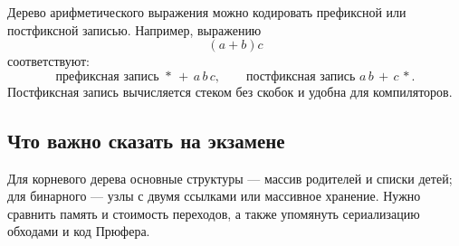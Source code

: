 Дерево арифметического выражения можно кодировать префиксной или постфиксной
записью. Например, выражению
\[
    (a+b)c
\]
соответствуют:
\[
    \text{префиксная запись } *\,+\,a\,b\,c,
    \qquad
    \text{постфиксная запись } a\,b\,+\,c\,*.
\]
Постфиксная запись вычисляется стеком без скобок и удобна для компиляторов.

\subsection{Что важно сказать на экзамене}

Для корневого дерева основные структуры --- массив родителей и списки детей; для
бинарного --- узлы с двумя ссылками или массивное хранение. Нужно сравнить память
и стоимость переходов, а также упомянуть сериализацию обходами и код Прюфера.

\newpage